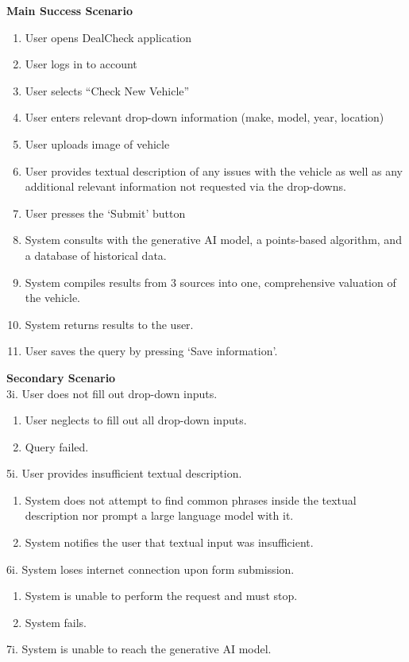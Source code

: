 \documentclass[]{article}
\begin{document}
\begin{enumerate}[{\bf {BE}1.}]
	{\bf Main Success Scenario}
		\begin{enumerate}[1.]
			\item User opens DealCheck application
			\item User logs in to account
			\item User selects “Check New Vehicle”
			\item User enters relevant drop-down information (make, model, year, location)
			\item User uploads image of vehicle
			\item User provides textual description of any issues with the vehicle as well as any additional relevant information not requested via the drop-downs.
			\item User presses the ‘Submit’ button
			\item System consults with the generative AI model, a points-based algorithm, and a database of historical data.
			\item System compiles results from 3 sources into one, comprehensive valuation of the vehicle.
			\item System returns results to the user.
			\item User saves the query by pressing ‘Save information’.
		\end{enumerate}
		{\bf Secondary Scenario} \\
		3i. User does not fill out drop-down inputs.
		\begin{enumerate}[{3i}.1]
			\item User neglects to fill out all drop-down inputs.
			\item Query failed.
		\end{enumerate}
		5i. User provides insufficient textual description.
		\begin{enumerate}[{5i}.1]
			\item System does not attempt to find common phrases inside the textual description nor prompt a large language model with it.
			\item System notifies the user that textual input was insufficient.
		\end{enumerate}
		6i. System loses internet connection upon form submission.
		\begin{enumerate}[{6i}.1]
			\item System is unable to perform the request and must stop.
			\item System fails.
		\end{enumerate}
		7i. System is unable to reach the generative AI model.

\end{enumerate}
\end{document}
